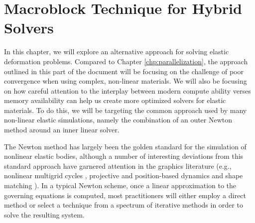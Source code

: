 \chapter{Macroblock Technique for Hybrid Solvers}
\label{chp:macroblocks}

In this chapter, we will explore an alternative approach for solving
elastic deformation problems. Compared to Chapter
\ref{chp:parallelization}, the approach outlined in this part of the
document will be focusing on the challenge of poor convergence when
using complex, non-linear materials. We will also be focusing on how
careful attention to the interplay between modern compute ability
verses memory availability can help us create more optimized solvers
for elastic materials. To do this, we will be targeting the common
approach used by many non-linear elastic simulations, namely the
combination of an outer Newton method around an inner linear solver.

The Newton method has largely been the golden standard for the
simulation of nonlinear elastic bodies, although a number of
interesting deviations from this standard approach have garnered
attention in the graphics literature (e.g., nonlinear multigrid cycles
\citep{ZhuSTB:2010}, projective and position-based dynamics
\citep{MuellHHR:2007,BouazMLKP:2014,Wang:2015} and shape matching
\citep{RiverJ:2007}). In a typical Newton scheme, once a linear
approximation to the governing equations is computed, most
practitioners will either employ a direct method or select a technique
from a spectrum of iterative methods in order to solve the resulting
system.


